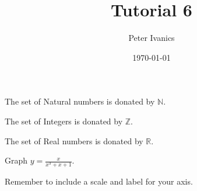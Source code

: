 \documentclass[11]{article}
\def\eq1{y=\frac{x}{x^3 + x + 1}} %
\def\labelaxis{Remember to include a scale and label for your axis.} %
\begin{document}
	\title{Tutorial 6}
	\author{Peter Ivanics}
	\date{\today}
	\maketitle
	
	The set of Natural numbers is donated by $\mathbb{N}$.
	
	The set of Integers is donated by $\mathbb{Z}$.
	
	The set of Real numbers is donated by $\mathbb{R}$.
	
	Graph $ \eq1 $.
	
	\labelaxis
\end{document}
